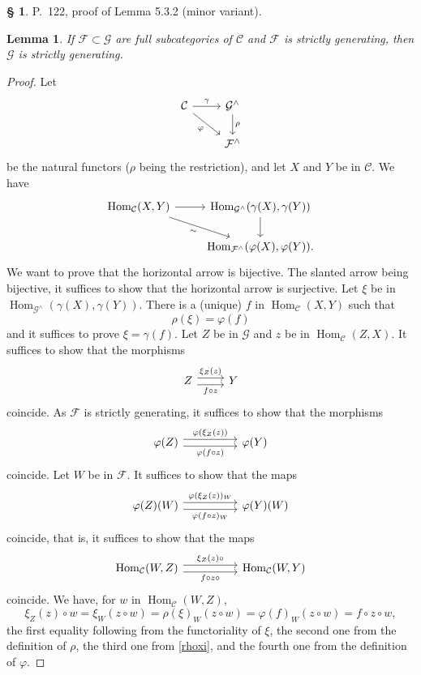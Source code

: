 \documentclass[12pt]{article}
\newtheorem{lem}[thm]{Lemma}
\theoremstyle{remark}
\theoremstyle{definition}
\newtheorem{s}[thm]{\S}
\newcommand{\C}{\mathcal C}
\newcommand{\F}{\mathcal F}
\newcommand{\G}{\mathcal G}
\newcommand{\mv}{ (minor variant)}
\DeclareMathOperator{\Hom}{Hom}%
\begin{document}
\begin{s} 
P.~122, proof of Lemma 5.3.2\mv. 
%
\begin{lem} 
If $\F\subset\G$ are full subcategories of $\C$ and $\F$ is strictly generating, then $\G$ is strictly generating. 
\end{lem} 
%
\begin{proof}
Let 
$$
\begin{tikzcd}
\C\ar{r}{\gamma}\ar{dr}[swap]{\varphi}&\G^\wedge\ar{d}{\rho}\\
&\F^\wedge
\end{tikzcd}
$$ 
be the natural functors ($\rho$ being the restriction), and let $X$ and $Y$ be in $\C$. We have 
$$
\begin{tikzcd}
\Hom_\C(X,Y)\ar{r}\ar{dr}[swap]{\sim}&\Hom_{\G^\wedge}(\gamma(X),\gamma(Y))\ar{d}\\
&\Hom_{\F^\wedge}(\varphi(X),\varphi(Y)). 
\end{tikzcd}
$$ 
We want to prove that the horizontal arrow is bijective. The slanted arrow being bijective, it suffices to show that the horizontal arrow is surjective. Let $\xi$ be in $\Hom_{\G^\wedge}(\gamma(X),\gamma(Y))$. There is a (unique) $f$ in $\Hom_\C(X,Y)$ such that %
\begin{equation}\label{rhoxi}
\rho(\xi)=\varphi(f)
\end{equation}
and it suffices to prove $\xi=\gamma(f)$. Let $Z$ be in $\G$ and $z$ be in $\Hom_\C(Z,X)$. It suffices to show that the morphisms 
$$
\begin{tikzcd}
Z\arrow[yshift=0.7ex]{r}{\xi_Z(z)}\arrow[yshift=-0.7ex]{r}[swap]{f\circ z}&Y
\end{tikzcd}
$$ 
coincide. As $\F$ is strictly generating, it suffices to show that the morphisms 
$$
\begin{tikzcd}
\varphi(Z)\arrow[yshift=0.7ex]{rr}{\varphi(\xi_Z(z))}\arrow[yshift=-0.7ex]{rr}[swap]{\varphi(f\circ z)}&&\varphi(Y)
\end{tikzcd}
$$ 
coincide. Let $W$ be in $\F$. It suffices to show that the maps 
$$
\begin{tikzcd}
\varphi(Z)(W)\arrow[yshift=0.7ex]{rr}{\varphi(\xi_Z(z))_W}\arrow[yshift=-0.7ex]{rr}[swap]{\varphi(f\circ z)_W}&&\varphi(Y)(W)
\end{tikzcd}
$$ 
coincide, that is, it suffices to show that the maps 
$$
\begin{tikzcd}
\Hom_\C(W,Z)\arrow[yshift=0.7ex]{rr}{\xi_Z(z)\circ}\arrow[yshift=-0.7ex]{rr}[swap]{f\circ z\circ}&&\Hom_\C(W,Y)
\end{tikzcd}
$$ 
coincide. We have, for $w$ in $\Hom_\C(W,Z)$,
$$
\xi_Z(z)\circ w=\xi_W(z\circ w)=\rho(\xi)_W(z\circ w)=\varphi(f)_W(z\circ w)
=f\circ z\circ w, 
$$ 
the first equality following from the functoriality of $\xi$, the second one from the definition of $\rho$, the third one from \eqref{rhoxi}, and the fourth one from the definition of $\varphi$.
\end{proof}
\end{s}
\end{document}
